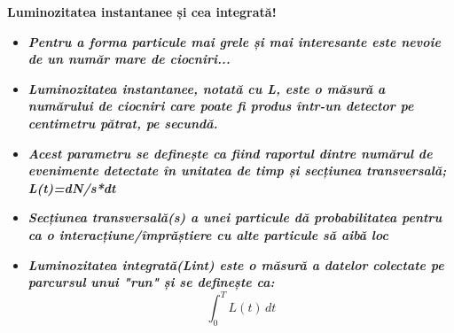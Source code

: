 \documentclass{beamer}
\begin{document}
\begin{frame}{\textbf{Luminozitatea instantanee și cea integrată!}}

\vspace{-0cm}

\begin{itemize}
   \item \makebox[0.5cm]{} \textbf{\textit{Pentru a forma particule mai grele și mai interesante este nevoie de un număr mare de ciocniri...}}
   \item \makebox[0.5cm]{} \textbf{\textit{Luminozitatea instantanee, notată cu L, este o măsură a numărului de ciocniri care poate fi produs într-un detector pe centimetru pătrat, pe secundă.}}

   \item \makebox[0.5cm]{} \textbf{\textit{Acest parametru se definește ca fiind raportul dintre numărul de evenimente detectate în unitatea de timp și secțiunea transversală; L(t)=dN/s*dt }}

   \item \makebox[0.5cm]{} \textbf{\textit{Secțiunea transversală(s) a unei particule dă probabilitatea pentru ca o interacțiune/împrăștiere cu alte particule să aibă loc}}

   \item \makebox[0.5cm]{} \textbf{\textit{Luminozitatea integrată(Lint) este o măsură a datelor colectate pe parcursul unui "run" și se definește ca: \[ \int_{0}^{T} L(t) \,dt \]}}
\end{itemize}
    
\end{frame}
\end{document}
